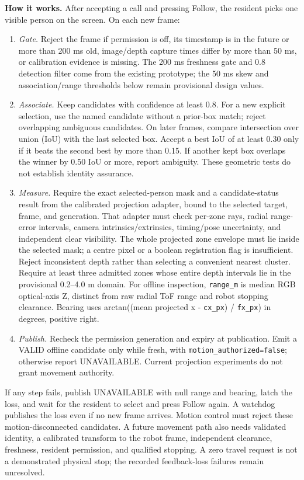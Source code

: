 \documentclass[12pt,letterpaper]{article}
\newcommand{\field}[1]{\texttt{#1}}
\begin{document}
\textbf{How it works.} After accepting a call and pressing Follow, the resident picks one visible person on the screen. On each new frame:
\begin{enumerate}\setlength{\itemsep}{2pt}
\item \emph{Gate.} Reject the frame if permission is off, its timestamp is in the future or more than 200 ms old, image/depth capture times differ by more than 50 ms, or calibration evidence is missing. The 200 ms freshness gate and 0.8 detection filter come from the existing prototype; the 50 ms skew and association/range thresholds below remain provisional design values.
\item \emph{Associate.} Keep candidates with confidence at least 0.8. For a new explicit selection, use the named candidate without a prior-box match; reject overlapping ambiguous candidates. On later frames, compare intersection over union (IoU) with the last selected box. Accept a best IoU of at least 0.30 only if it beats the second best by more than 0.15. If another kept box overlaps the winner by 0.50 IoU or more, report ambiguity. These geometric tests do not establish identity assurance.
\item \emph{Measure.} Require the exact selected-person mask and a candidate-status result from the calibrated projection adapter, bound to the selected target, frame, and generation. That adapter must check per-zone rays, radial range-error intervals, camera intrinsics/extrinsics, timing/pose uncertainty, and independent clear visibility. The whole projected zone envelope must lie inside the selected mask; a centre pixel or a boolean registration flag is insufficient. Reject inconsistent depth rather than selecting a convenient nearest cluster. Require at least three admitted zones whose entire depth intervals lie in the provisional 0.2--4.0 m domain. For offline inspection, \field{range\_m} is median RGB optical-axis Z, distinct from raw radial ToF range and robot stopping clearance. Bearing uses arctan((mean projected x - \field{cx\_px}) / \field{fx\_px}) in degrees, positive right.
\item \emph{Publish.} Recheck the permission generation and expiry at publication. Emit a VALID offline candidate only while fresh, with \field{motion\_authorized=false}; otherwise report UNAVAILABLE. Current projection experiments do not grant movement authority.
\end{enumerate}
If any step fails, publish UNAVAILABLE with null range and bearing, latch the loss, and wait for the resident to select and press Follow again. A watchdog publishes the loss even if no new frame arrives. Motion control must reject these motion-disconnected candidates. A future movement path also needs validated identity, a calibrated transform to the robot frame, independent clearance, freshness, resident permission, and qualified stopping. A zero travel request is not a demonstrated physical stop; the recorded feedback-loss failures remain unresolved.
\end{document}
